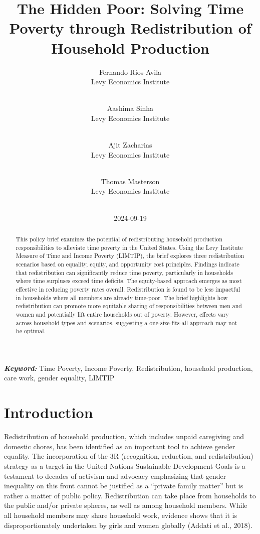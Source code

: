\documentclass[
  11pt,
]{article}
\title{The Hidden Poor: Solving Time Poverty through Redistribution of
Household Production}
\author{
Fernando Rios-Avila\\
Levy Economics Institute\\
\\
\and 
Aashima Sinha\\
Levy Economics Institute\\
\\
\and 
Ajit Zacharias\\
Levy Economics Institute\\
\\
\and 
Thomas Masterson\\
Levy Economics Institute\\
\\
}
\date{2024-09-19}
\begin{document}
\def\spacingset#1{\renewcommand{\baselinestretch}%
{#1}\small\normalsize} \spacingset{1}


\maketitle
\begin{abstract}
This policy brief examines the potential of redistributing household
production responsibilities to alleviate time poverty in the United
States. Using the Levy Institute Measure of Time and Income Poverty
(LIMTIP), the brief explores three redistribution scenarios based on
equality, equity, and opportunity cost principles. Findings indicate
that redistribution can significantly reduce time poverty, particularly
in households where time surpluses exceed time deficits. The
equity-based approach emerges as most effective in reducing poverty
rates overall. Redistribution is found to be less impactful in
households where all members are already time-poor. The brief highlights
how redistribution can promote more equitable sharing of
responsibilities between men and women and potentially lift entire
households out of poverty. However, effects vary across household types
and scenarios, suggesting a one-size-fits-all approach may not be
optimal.
\end{abstract}
 
\vspace{.2in}

\textbf{\textit{Keyword: }}Time Poverty, Income Poverty, Redistribution,
household production, care work, gender equality, LIMTIP


\thispagestyle{empty}
\clearpage{}
\newpage
\spacingset{1.2} %
\section{Introduction}\label{introduction}

Redistribution of household production, which includes unpaid caregiving
and domestic chores, has been identified as an important tool to achieve
gender equality. The incorporation of the 3R (recognition, reduction,
and redistribution) strategy as a target in the United Nations
Sustainable Development Goals is a testament to decades of activism and
advocacy emphasizing that gender inequality on this front cannot be
justified as a ``private family matter'' but is rather a matter of
public policy. Redistribution can take place from households to the
public and/or private spheres, as well as among household members. While
all household members may share household work, evidence shows that it
is disproportionately undertaken by girls and women globally (Addati et
al., 2018).
\end{document}
